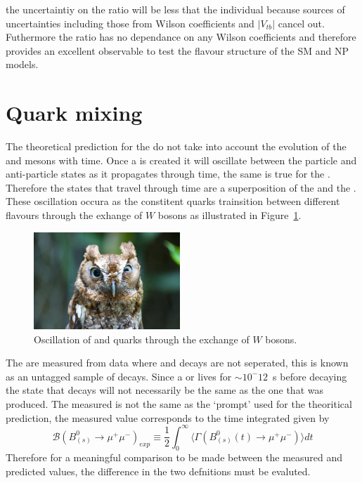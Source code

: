 {the uncertaintiy on the ratio will be less that the individual \BFs because sources of uncertainties including those from Wilson coefficients and $|V_{tb}|$ cancel out. Futhermore the ratio has no dependance on any Wilson coefficients and therefore provides an excellent observable to test the flavour structure of the SM and NP models.


\section{Quark mixing}
\label{sec:quarkmaixing}
The theoretical prediction for the \bmumu \BFs do not take into account the evolution of the \bsd and \barbsd mesons with time. Once a \bsd is created it will oscillate between the particle and anti-particle states as it propagates through time, the same is true for the \barbsd. Therefore the states that travel through time are a superposition of the \bsd and the \barbsd. These oscillation occura as the constitent quarks trainsition between different flavours through the exhange of $W$ bosons as illustrated in Figure~\ref{fig:Oscl_diag}.
\begin{figure}[htbp]
    \centering
        \includegraphics[width=0.49\textwidth]{./Figs/placeholder.jpeg}
    \caption{Oscillation of \bsd and \barbsd quarks through the exchange of $W$ bosons.}
    \label{fig:Oscl_diag}
\end{figure}
The \BFs are measured from data where \bsd and \barbsd decays are not seperated, this is known as an untagged sample of \bmumu decays. Since a \bsd or \barbsd lives for $\sim 10^-12$~s before decaying the state that decays will not necessarily be the same as the one that was produced. The measured \BF is not the same as the `prompt' \BF used for the theoritical prediction, the measured value corresponds to the time integrated \BF given by
\begin{equation}
  \mathcal{B}(B^0_{(s)} \to \mu^+ \mu^-)_{exp} \equiv \frac{1}{2} \int^{\infty}_0 \langle \Gamma(B^0_{(s)}(t) \to \mu^+\mu^-) \rangle dt
\label{eq:time_BF}
\end{equation}
Therefore for a meaningful comparison to be made between the measured and predicted \BF values, the difference in the two defnitions must be evaluted.

}
